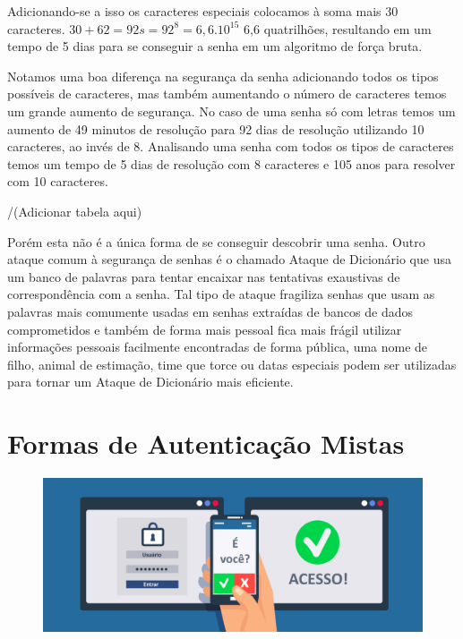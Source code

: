 Adicionando-se a isso os caracteres especiais colocamos à soma mais 30 caracteres. \( 30 + 62 = 92 s = 92^8 = 6,6 . 10^{15} \) 6,6 quatrilhões, resultando em um tempo de 5 dias para se conseguir a senha em um algoritmo de força bruta.

Notamos uma boa diferença na segurança da senha adicionando todos os tipos possíveis de caracteres, mas também aumentando o número de caracteres temos um grande aumento de segurança. No caso de uma senha só com letras temos um aumento de 49 minutos de resolução para 92 dias de resolução utilizando 10 caracteres, ao invés de 8. Analisando uma senha com todos os tipos de caracteres temos um tempo de 5 dias de resolução com 8 caracteres e 105 anos para resolver com 10 caracteres.

/(Adicionar tabela aqui)

Porém esta não é a única forma de se conseguir descobrir uma senha. Outro ataque comum à segurança de senhas é o chamado Ataque de Dicionário que usa um banco de palavras para tentar encaixar nas tentativas exaustivas de correspondência com a senha. Tal tipo de ataque fragiliza senhas que usam as palavras mais comumente usadas em senhas extraídas de bancos de dados comprometidos e também de forma mais pessoal fica mais frágil utilizar informações pessoais facilmente encontradas de forma pública, uma nome de filho, animal de estimação, time que torce ou datas especiais podem ser utilizadas para tornar um Ataque de Dicionário mais eficiente.

\section{Formas de Autenticação Mistas}
\begin{figure}[h]
\centering
\includegraphics[width=\textwidth]{img/multipla_autenticacao.png}
\end{figure}

